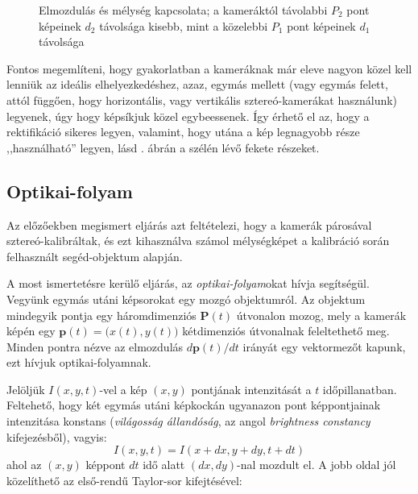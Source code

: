 \begin{figure}[tbh]
  \caption{Elmozdulás és mélység kapcsolata; a kameráktól távolabbi $P_2$ pont képeinek $d_2$ távolsága kisebb, mint a közelebbi $P_1$ pont képeinek $d_1$ távolsága \label{fig:depth-showcase}}
\end{figure}

Fontos megemlíteni, hogy gyakorlatban a kameráknak már eleve nagyon közel kell lenniük az ideális elhelyezkedéshez, azaz, egymás mellett (vagy egymás felett, attól függően, hogy horizontális, vagy vertikális sztereó-kamerákat használunk) legyenek, úgy hogy képsíkjuk közel egybeessenek. Így érhető el az, hogy a rektifikáció sikeres legyen, valamint, hogy utána a kép legnagyobb része ,,használható'' legyen, lásd . ábrán a szélén lévő fekete részeket.

\subsection{Optikai-folyam \label{methods:optic}}

Az előzőekben megismert eljárás azt feltételezi, hogy a kamerák párosával sztereó-kalib\-ráltak, és ezt kihasználva számol mélységképet a kalibráció során felhasznált segéd-objek\-tum alapján.

A most ismertetésre kerülő eljárás, az \textit{optikai-folyam}okat \cite{optic-flow} hívja segítségül. Vegyünk egymás utáni képsorokat egy mozgó objektumról. Az objektum mindegyik pontja egy háromdimenziós $\mathbf{P}(t)$ útvonalon mozog, mely a kamerák képén egy $\mathbf{p}(t) = \big(x(t), y(t)\big)$ kétdimenziós útvonalnak feleltethető meg. Minden pontra nézve az elmozdulás $d\mathbf{p}(t) / dt$ irányát egy vektormezőt kapunk, ezt hívjuk optikai-folyamnak.

Jelöljük $I(x, y, t)$-vel a kép $(x, y)$ pontjának intenzitását a $t$ időpillanatban. Feltehető, hogy két egymás utáni képkockán ugyanazon pont képpontjainak intenzitása konstans (\textit{világosság állandóság}, az angol \textit{brightness constancy} kifejezésből), vagyis:
\[I(x, y, t) = I(x+dx, y+dy, t+dt)\]
ahol az $(x,y)$ képpont $dt$ idő alatt $(dx,dy)$-nal mozdult el. A jobb oldal jól közelíthető az első-rendű Taylor-sor kifejtésével:

